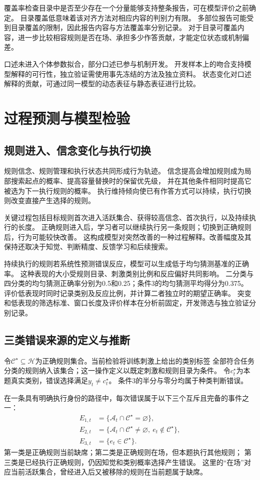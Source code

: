 \documentclass[11pt,a4paper]{article}
\numberwithin{equation}{section}
\newcommand{\A}{\mathcal{A}}
\newcommand{\Hh}{\mathcal{H}}
\begin{document}
覆盖率检查目录中是否至少存在一个分量能够支持整条报告，可在模型评价之前确定。
目录覆盖低意味着该对齐方法对相应内容的判别力有限。
多部位报告可能受到目录覆盖的限制，因此报告内容与方法覆盖率分别记录。
对于目录可覆盖内容，进一步比较相容规则是否在场、承担多少作答贡献，才能定位状态或机制偏差。

口述未进入个体参数拟合，部分口述已参与机制开发。
开发样本上的吻合支持模型解释的可行性，独立验证需使用事先冻结的方法及独立资料。
状态变化对口述解释的贡献，可通过同一模型的动态表征与静态表征进行比较。

\section{过程预测与模型检验}
\label{sec:validation}

\subsection{规则进入、信念变化与执行切换}
规则信念、规则管理和执行状态共同形成行为轨迹。
信念提高会增加规则成为局部搜索起点的概率、提高容量替换时的保留优先级，
并在其他条件相同时提高它被选为下一执行规则的概率。
执行维持倾向使已有作答方式可以持续，执行切换则改变直接产生选择的规则。

关键过程包括目标规则首次进入活跃集合、获得较高信念、首次执行，以及持续执行的长度。
正确规则进入后，学习者可以继续执行另一条规则；切换到正确规则后，行为可能较快改善。
这构成模型对突然改善的一种过程解释。改善幅度及其保持还取决于知觉、判断精度、反馈学习和后续搜索。

持续执行的规则若系统性预测错误反应，模型可以生成低于均匀猜测基准的正确率。
这种表现的大小受规则目录、刺激类别比例和反应偏好共同影响。
二分类与四分类的均匀猜测正确率分别为0.5和0.25；条件3的均匀猜测平均得分为0.375。
评价低表现时同时记录类别及反应比例，并计算二者独立时的期望正确率。
突变和低表现的筛选标准、窗口长度及评价样本在分析前固定，开发筛选与独立验证分别记录。

\subsection{三类错误来源的定义与推断}
\label{sec:error-sources}
令$\mathcal C^\star\subseteq\Hh$为正确规则集合。当前检验将训练刺激上给出的类别标签
全部符合任务分类的规则纳入该集合；这一操作定义以既定刺激和规则目录为条件。
令$c_t^\star$为本题真实类别，错误选择满足$y_t\ne c_t^\star$。
条件3的半分与零分均属于种类判断错误。

在一条具有明确执行身份的路径中，每次错误属于以下三个互斥且完备的事件之一：
\begin{align}
E_{1,t}&=\{\A_t\cap\mathcal C^\star=\varnothing\},\label{eq:error-absent}\\
E_{2,t}&=\{\A_t\cap\mathcal C^\star\ne\varnothing,\ e_t\notin\mathcal C^\star\},\label{eq:error-other}\\
E_{3,t}&=\{e_t\in\mathcal C^\star\}.\label{eq:error-executed}
\end{align}
第一类是正确规则当前缺席；第二类是正确规则在场，但本题执行其他规则；
第三类是已经执行正确规则，仍因知觉和类别概率选择产生错误。
这里的“在场”对应当前活跃集合，曾经进入后又被移除的规则在当前题属于缺席。
\end{document}
